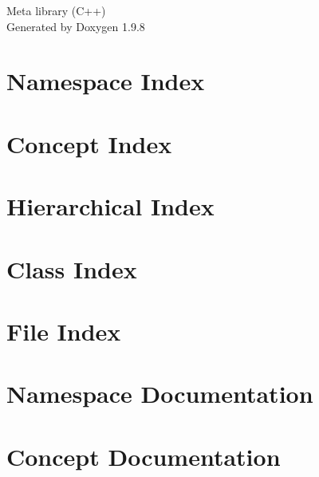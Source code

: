 \documentclass[twoside]{book}
\newcommand{\+}{\discretionary{\mbox{\scriptsize$\hookleftarrow$}}{}{}}
\newcommand{\clearemptydoublepage}{%
    \newpage{\pagestyle{empty}\cleardoublepage}%
  }
\begin{document}
  \raggedbottom
    \hypersetup{pageanchor=false,
                bookmarksnumbered=true,
                pdfencoding=unicode
               }
  \begin{titlepage}
  \vspace*{7cm}
  \begin{center}%
  {\Large Meta library (\+C++)}\\
  \vspace*{1cm}
  {\large Generated by Doxygen 1.9.8}\\
  \end{center}
  \end{titlepage}
  \clearemptydoublepage
  \tableofcontents
  \clearemptydoublepage
  \hypersetup{pageanchor=true}


\chapter{Namespace Index}

\chapter{Concept Index}

\chapter{Hierarchical Index}

\chapter{Class Index}

\chapter{File Index}

\chapter{Namespace Documentation}





\chapter{Concept Documentation}

\end{document}
